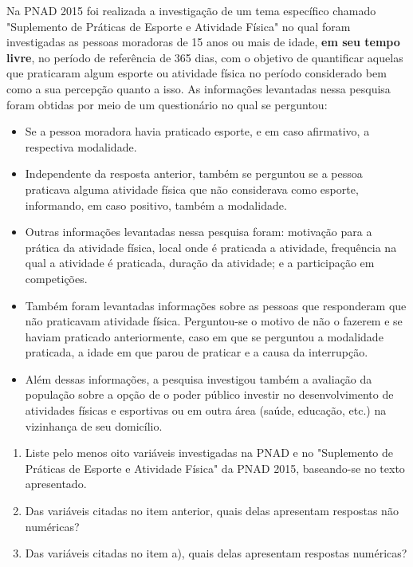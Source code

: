 \documentclass[10 pt,usenames,dvipsnames, oneside]{article}
\begin{document}
Na PNAD 2015 foi realizada a investigação de um tema específico chamado "Suplemento de Práticas de Esporte e Atividade Física" no qual foram investigadas as pessoas moradoras de 15 anos ou mais de idade, \textbf{em seu tempo livre}, no período de referência de 365 dias, com o objetivo de quantificar aquelas que praticaram algum esporte ou atividade física no período considerado bem como a sua percepção quanto a isso. As informações levantadas nessa pesquisa foram obtidas por meio de um questionário no qual se perguntou:
\begin{itemize}
\item {} 
Se a pessoa moradora havia praticado esporte, e em caso afirmativo, a respectiva modalidade.

\item {} 
Independente da resposta anterior, também se perguntou se a pessoa praticava alguma atividade física que não considerava como esporte, informando, em caso positivo, também a modalidade.

\item {} 
Outras informações levantadas nessa pesquisa foram: motivação para a prática da atividade física, local onde é praticada a atividade, frequência na qual a atividade é praticada, duração da atividade; e a participação em competições.

\item {} 
Também foram levantadas informações sobre as pessoas que responderam que não praticavam atividade física. Perguntou-se o motivo de não o fazerem e se haviam praticado anteriormente, caso em que se perguntou a modalidade praticada, a idade em que parou de praticar e a causa da interrupção.

\item {} 
Além dessas informações, a pesquisa investigou também a avaliação da população sobre a opção de o poder público investir no desenvolvimento de atividades físicas e esportivas ou em outra área (saúde, educação, etc.) na vizinhança de seu domicílio.

\end{itemize}
\begin{enumerate}
\item {} 
Liste pelo menos oito variáveis investigadas na PNAD e no "Suplemento de Práticas de Esporte e Atividade Física" da PNAD 2015, baseando-se no texto apresentado.

\item {} 
Das variáveis citadas no item anterior, quais delas apresentam respostas não numéricas?

\item {} 
Das variáveis citadas no item a), quais delas apresentam respostas numéricas?

\end{enumerate}
\end{document}
